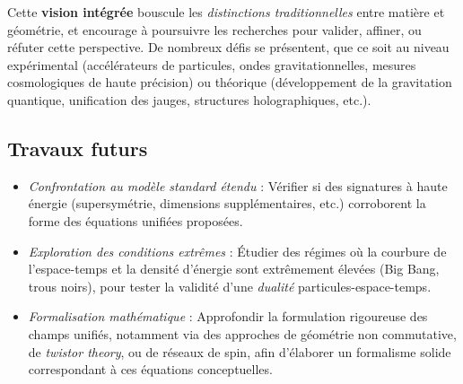 \documentclass[12pt]{article}
\begin{document}
Cette \textbf{vision intégrée} bouscule les \emph{distinctions traditionnelles} 
entre matière et géométrie, et encourage à poursuivre les recherches pour valider, 
affiner, ou réfuter cette perspective. De nombreux défis se présentent, 
que ce soit au niveau expérimental (accélérateurs de particules, ondes gravitationnelles, 
mesures cosmologiques de haute précision) ou théorique (développement de la gravitation quantique, 
unification des jauges, structures holographiques, etc.).

\subsection*{Travaux futurs}
\begin{itemize}
    \item \emph{Confrontation au modèle standard étendu} : Vérifier si des signatures 
          à haute énergie (supersymétrie, dimensions supplémentaires, etc.) 
          corroborent la forme des équations unifiées proposées.
    \item \emph{Exploration des conditions extrêmes} : Étudier des régimes où la courbure 
          de l'espace-temps et la densité d'énergie sont extrêmement élevées 
          (Big Bang, trous noirs), pour tester la validité d'une \emph{dualité} 
          particules-espace-temps.
    \item \emph{Formalisation mathématique} : Approfondir la formulation rigoureuse 
          des champs unifiés, notamment via des approches de géométrie non commutative, 
          de \emph{twistor theory}, ou de réseaux de spin, afin d'élaborer un formalisme 
          solide correspondant à ces équations conceptuelles.
\end{itemize}
\end{document}
